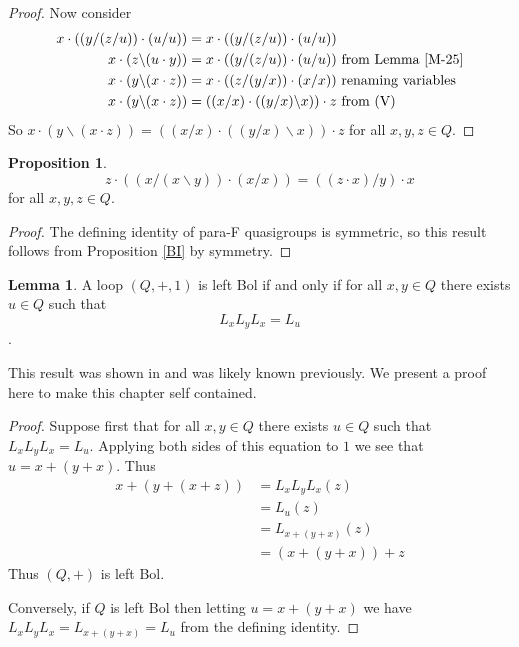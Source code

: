 \documentclass[12pt, twoside, openright]{report}
\theoremstyle{definition}
\newtheorem{lem}[thm]{Lemma}
\newtheorem{prp}[thm]{Proposition}
\newcommand{\ldv}{\backslash}       %
\newcommand{\rdv}{/}                %
\begin{document}
\begin{proof}
  Now consider
  \begin{align*}
    x\cdot((y/(z/u))\cdot (u/u)) &= x\cdot((y/(z/u))\cdot (u/u))\\
    x\cdot(z\ldv (u\cdot y)) &= x\cdot((y/(z/u))\cdot (u/u))\text{ from Lemma \ref{M-25}}\\
    x\cdot(y\ldv (x\cdot z)) &= x\cdot((z/(y/x))\cdot (x/x))\text{ renaming variables}\\
    x\cdot(y\ldv (x\cdot z)) &= ((x/x)\cdot((y/x)\ldv x))\cdot z\text{ from (V)}
  \end{align*}
  So $x\cdot(y\ldv (x\cdot z)) = ((x/x)\cdot((y/x)\ldv x))\cdot z$ for all $x, y, z\in Q$.
\end{proof}

\begin{prp}\label{BI-dual}
  \[z\cdot((x\rdv(x\ldv y))\cdot (x\rdv x)) = ((z\cdot x)\rdv y)\cdot x\]
  for all $x, y, z\in Q$.
\end{prp}

\begin{proof}
  The defining identity of para-F quasigroups is symmetric, so this result follows from Proposition \ref{BI}
    by symmetry.
\end{proof}

\begin{lem}\label{bol-char}
  A loop $(Q, +, 1)$ is left Bol if and only if for all $x, y\in Q$ there exists $u \in Q$ such that 
  \[L_x L_y L_x = L_u\] \cite{BK-isotopes}.
\end{lem}

This result was shown in \cite{BK-isotopes} and was likely known previously. We present a proof here to
  make this chapter self contained.

\begin{proof}
  Suppose first that for all $x, y \in Q$ there exists $u\in Q$ such that $L_x L_y L_x = L_u$. Applying
    both sides of this equation to $1$ we see that $u = x + (y + x)$. Thus
  \begin{align*}
    x + (y + (x + z)) &= L_x L_y L_x(z)\\
    &= L_u(z)\\
    &= L_{x + (y + x)}(z)\\
    &= (x + (y + x)) + z
  \end{align*}
  Thus $(Q, +)$ is left Bol.

  Conversely, if $Q$ is left Bol then letting $u = x + (y + x)$ we
    have $L_x L_y L_x = L_{x + (y + x)} = L_u$ from the defining identity.
\end{proof}
\end{document}
